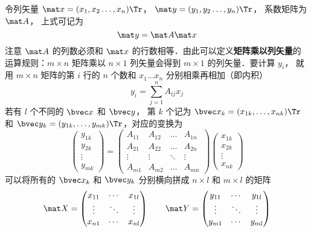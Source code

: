 令列矢量 $\mat x = (x_1,x_2 \dots, x_n)\Tr $，  $\mat y = (y_1,y_2 \dots, y_n)\Tr$， 系数矩阵为 $\mat A$， 上式可记为
\begin{equation}\label{Mat_eq5}
\mat y = \mat A\mat x
\end{equation} 
注意 $\mat A$ 的列数必须和 $\mat x$ 的行数相等．由此可以定义\textbf{矩阵乘以列矢量}的运算规则：$m \times n$ 矩阵乘以 $n \times 1$ 列矢量会得到 $m \times 1$ 的列矢量．要计算 $y_i$， 就用 $m \times n$ 矩阵的第 $i$ 行的 $n$ 个数和 $x_1 \dots x_n$ 分别相乘再相加（即内积）
\begin{equation}
y_i = \sum_{j = 1}^n A_{ij} x_j 
\end{equation}
若有 $l$ 个不同的 $\bvec x$ 和 $\bvec y$， 第 $k$ 个记为 $\bvec x_k = (x_{1k},\dots, x_{nk})\Tr$ 和 $\bvec y_k = (y_{1k},\dots, y_{mk})\Tr$，对应的变换为
\begin{equation}
\begin{pmatrix} y_{1k} \\ y_{2k}\\ \vdots \\ y_{mk} \end{pmatrix}
= \begin{pmatrix}
A_{11}  & A_{12} & \ldots & A_{1n} \\
A_{21}  & A_{22} & \ldots & A_{2n} \\
 \vdots & \vdots  & \ddots & \vdots \\
A_{m1}  & A_{m2} & \ldots & A_{mn}
\end{pmatrix}
\begin{pmatrix} x_{1k} \\ x_{2k} \\ \vdots \\ x_{nk} \end{pmatrix}
\end{equation}
可以将所有的 $\bvec x_k$ 和 $\bvec y_k$ 分别横向拼成 $n \times l$ 和 $m \times l$ 的矩阵
\begin{equation}
\mat X =
\begin{pmatrix}
x_{11} & \cdots & x_{1l} \\
 \vdots & \ddots & \vdots \\
x_{n1} & \cdots & x_{nl}
\end{pmatrix}
\qquad
\mat Y =
\begin{pmatrix}
y_{11} & \cdots & y_{1l} \\
 \vdots & \ddots & \vdots \\
y_{m1} & \cdots & y_{ml}
\end{pmatrix}
\end{equation}

